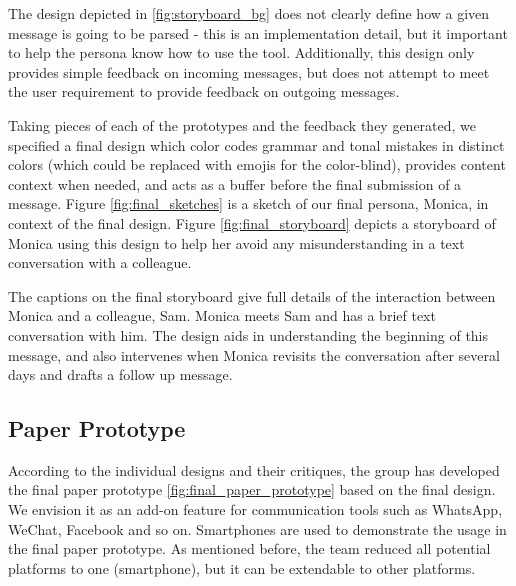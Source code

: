 \documentclass[acmsmall,screen,authorversion,nonacm]{acmart}
\begin{document}
The design depicted in \ref{fig:storyboard_bg} does not clearly define how a given message is going to be parsed - this is an implementation detail, but it important to help the persona know how to use the tool. Additionally, this design only provides simple feedback on incoming messages, but does not attempt to meet the user requirement to provide feedback on outgoing messages. 

Taking pieces of each of the prototypes and the feedback they generated, we specified a final design which color codes grammar and tonal mistakes in distinct colors (which could be replaced with emojis for the color-blind), provides content context when needed, and acts as a buffer before the final submission of a message. Figure \ref{fig:final_sketches} is a sketch of our final persona, Monica, in context of the final design. Figure \ref{fig:final_storyboard} depicts a storyboard of Monica using this design to help her avoid any misunderstanding in a text conversation with a colleague.

The captions on the final storyboard give full details of the interaction between Monica and a colleague, Sam. Monica meets Sam and has a brief text conversation with him. The design aids in understanding the beginning of this message, and also intervenes when Monica revisits the conversation after several days and drafts a follow up message.

\subsection{Paper Prototype}
\label{paper_prototype}


According to the individual designs and their critiques, the group has developed the final paper prototype \ref{fig:final_paper_prototype} based on the final design. We envision it as an add-on feature for communication tools such as WhatsApp, WeChat, Facebook and so on. Smartphones are used to demonstrate the usage in the final paper prototype. As mentioned before, the team reduced all potential platforms to one (smartphone), but it can be extendable to other platforms. 
\end{document}
